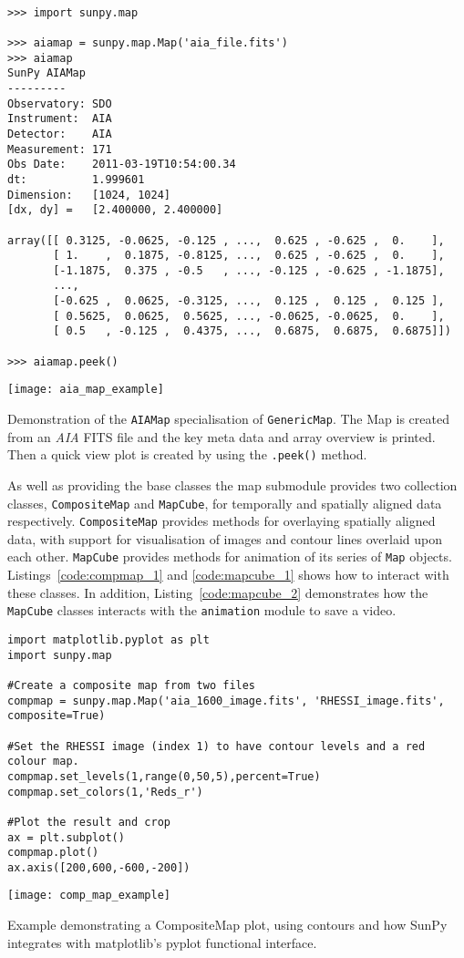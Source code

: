 \begin{listing}[H]
\begin{verbatim}

>>> import sunpy.map

>>> aiamap = sunpy.map.Map('aia_file.fits')
>>> aiamap
SunPy AIAMap
---------
Observatory: SDO
Instrument:  AIA
Detector:    AIA
Measurement: 171
Obs Date:    2011-03-19T10:54:00.34
dt:          1.999601
Dimension:   [1024, 1024]
[dx, dy] =   [2.400000, 2.400000]

array([[ 0.3125, -0.0625, -0.125 , ...,  0.625 , -0.625 ,  0.    ],
       [ 1.    ,  0.1875, -0.8125, ...,  0.625 , -0.625 ,  0.    ],
       [-1.1875,  0.375 , -0.5   , ..., -0.125 , -0.625 , -1.1875],
       ..., 
       [-0.625 ,  0.0625, -0.3125, ...,  0.125 ,  0.125 ,  0.125 ],
       [ 0.5625,  0.0625,  0.5625, ..., -0.0625, -0.0625,  0.    ],
       [ 0.5   , -0.125 ,  0.4375, ...,  0.6875,  0.6875,  0.6875]])

>>> aiamap.peek()
\end{verbatim}
\texttt{[image: aia\_map\_example]}
\caption{Demonstration of the \texttt{AIAMap} specialisation of 
\texttt{GenericMap}. The Map is created from an \textit{AIA} FITS file and the 
key meta data and array overview is printed. Then a quick view plot is created 
by using the \texttt{.peek()} method.}
\label{code:aia_1}
\end{listing}

As well as providing the base classes the map submodule provides two 
collection classes, \texttt{CompositeMap} and \texttt{MapCube}, for 
temporally and spatially aligned data respectively.
\texttt{CompositeMap} provides methods for overlaying spatially aligned 
data, with support for visualisation of images and contour lines overlaid 
upon each other.
\texttt{MapCube} 
provides methods for animation of its series of \texttt{Map} objects. 
Listings~\ref{code:compmap_1} and \ref{code:mapcube_1} shows how to interact 
with these classes.
In addition, Listing~\ref{code:mapcube_2} demonstrates how the \texttt{MapCube} 
classes interacts with the \texttt{animation} module to save a video.

\begin{listing}[H]
\begin{verbatim}
import matplotlib.pyplot as plt
import sunpy.map

#Create a composite map from two files
compmap = sunpy.map.Map('aia_1600_image.fits', 'RHESSI_image.fits', 
composite=True)

#Set the RHESSI image (index 1) to have contour levels and a red colour map.
compmap.set_levels(1,range(0,50,5),percent=True)
compmap.set_colors(1,'Reds_r')

#Plot the result and crop
ax = plt.subplot()
compmap.plot()
ax.axis([200,600,-600,-200])
\end{verbatim}
\texttt{[image: comp\_map\_example]}
\caption{Example demonstrating a CompositeMap plot, using contours and how 
SunPy integrates with matplotlib's pyplot functional interface.}
\label{code:compmap_1}
\end{listing}

